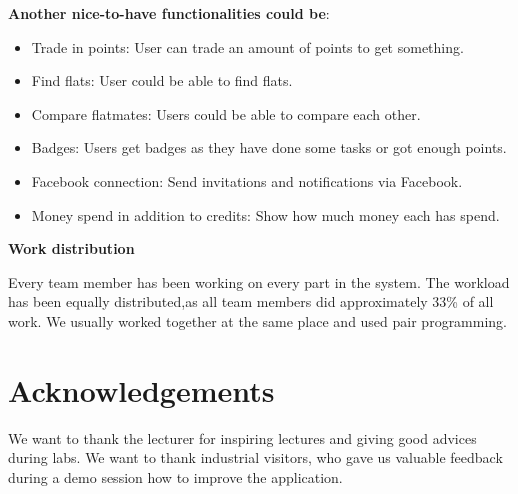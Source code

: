 \documentclass{sig-alt-release2}
\begin{document}
\textbf{Another nice-to-have functionalities could be}:
\begin{itemize}
\item Trade in points: User can trade an amount of points to get something.
\item Find flats: User could be able to find flats.
\item Compare flatmates: Users could be able to compare each other.
\item Badges: Users get badges as they have done some tasks or got enough points.
\item Facebook connection: Send invitations and notifications via Facebook.
\item Money spend in addition to credits: Show how much money each has spend.
\end{itemize}

\textbf{Work distribution}

Every team member has been working on every part in the system. The workload has
been equally distributed,as all team members did approximately 33\% of all work.
We usually worked together at the same place and used pair programming.
 

\section{Acknowledgements}

We want to thank the lecturer for inspiring lectures and giving good advices during labs.
We want to thank industrial visitors, who gave us valuable feedback during a demo session how to improve the application.




\appendix
\end{document}
